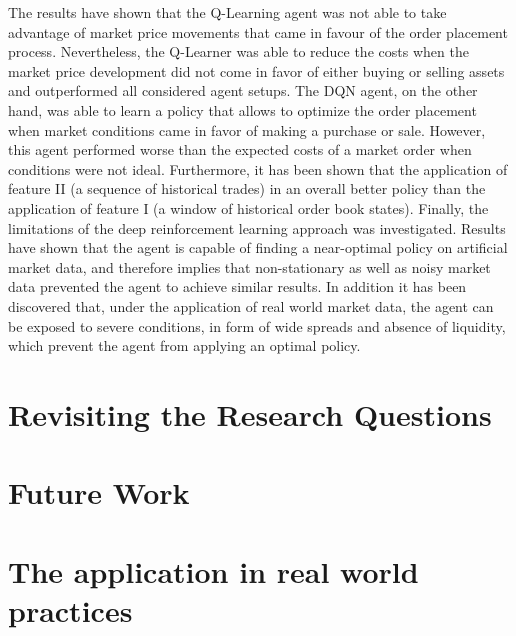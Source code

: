 The results have shown that the Q-Learning agent was not able to take advantage of market price movements that came in favour of the order placement process.
Nevertheless, the Q-Learner was able to reduce the costs when the market price development did not come in favor of either buying or selling assets and outperformed all considered agent setups.
The DQN agent, on the other hand, was able to learn a policy that allows to optimize the order placement when market conditions came in favor of making a purchase or sale.
However, this agent performed worse than the expected costs of a market order when conditions were not ideal.
Furthermore, it has been shown that the application of feature II (a sequence of historical trades) in an overall better policy than the application of feature I (a window of historical order book states).
Finally, the limitations of the deep reinforcement learning approach was investigated.
Results have shown that the agent is capable of finding a near-optimal policy on artificial market data, and therefore implies that non-stationary as well as noisy market data prevented the agent to achieve similar results.
In addition it has been discovered that, under the application of real world market data, the agent can be exposed to severe conditions, in form of wide spreads and absence of liquidity, which prevent the agent from applying an optimal policy.

\section{Revisiting the Research Questions}


\section{Future Work}

\section{The application in real world practices}